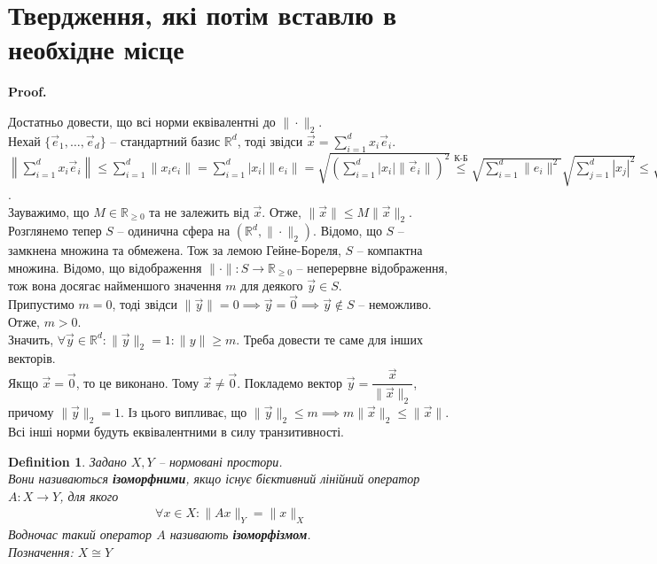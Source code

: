 \documentclass[a4paper, 10pt]{article}
\makeatletter
\theoremstyle{theoremdd}
\theoremstyle{theoremdd}
\newtheorem{definition}[theorem]{Definition}
\theoremstyle{theoremdd}
\theoremstyle{theoremdd}
\theoremstyle{theoremdd}
\theoremstyle{theoremdd}
\theoremstyle{theoremdd}
\theoremstyle{theoremdd}
\renewenvironment{proof}[1][Proof.\\]{\par
\pushQED{\hfill \qed}%
\normalfont \topsep6\p@\@plus6\p@\relax
\trivlist
\item\relax
{\bfseries
#1\@addpunct{.}}\hspace\labelsep\ignorespaces
}{%
\popQED\endtrivlist\@endpefalse
}
\makeatother
\begin{document}
\section*{Твердження, які потім вставлю в необхідне місце}
\begin{proof}
Достатньо довести, що всі норми еквівалентні до $\| \cdot \|_2$.\\
Нехай $\{\vec{e}_1,\dots,\vec{e}_d\}$ -- стандартний базис $\mathbb{R}^d$, тоді звідси $\vec{x} = \displaystyle\sum_{i=1}^d x_i \vec{e}_i$.\\
$\displaystyle\left\| \sum_{i=1}^d x_i \vec{e}_i
 \right\| \leq \sum_{i=1}^d \| x_i e_i \| = \sum_{i=1}^d |x_i| \|e_i\| = \sqrt{\left( \sum_{i=1}^d |x_i| \|\vec{e}_i\| \right)^2} \overset{\text{К-Б}}{\leq} \sqrt{\sum_{i=1}^d \|e_i\|^2} \sqrt{\sum_{j=1}^d |x_j|^2} \leq \sqrt{\sum_{i=1}^d \|e_i\|^2} \sqrt{\sum_{j=1}^\infty |x_j|^2} = \sqrt{\sum_{i=1}^d \|e_i\|^2} \|\vec{x}\|_2 = M \|\vec{x}\|_2$.\\
Зауважимо, що $M \in \mathbb{R}_{\geq 0}$ та не залежить від $\vec{x}$. Отже, $\|\vec{x}\| \leq M \|\vec{x}\|_2$.
\bigskip \\
Розглянемо тепер $S$ -- одинична сфера на $(\mathbb{R}^d, \|\cdot \|_2)$. Відомо, що $S$ -- замкнена множина та обмежена. Тож за лемою Гейне-Бореля, $S$ -- компактна множина. Відомо, що відображення $\| \cdot \| \colon S \to \mathbb{R}_{\geq 0}$ -- неперервне відображення, тож вона досягає найменшого значення $m$ для деякого $\vec{y} \in S$.\\
Припустимо $m = 0$, тоді звідси $\|\vec{y}\| = 0 \implies \vec{y} = \vec{0} \implies \vec{y} \notin S$ -- неможливо. Отже, $m > 0$.\\
Значить, $\forall \vec{y} \in \mathbb{R}^d: \|\vec{y}\|_2 = 1: \|y\| \geq m$. Треба довести те саме для інших векторів.\\
Якщо $\vec{x} = \vec{0}$, то це виконано. Тому $\vec{x} \neq \vec{0}$. Покладемо вектор $\vec{y} = \dfrac{\vec{x}}{\| \vec{x} \|_2}$, причому $\|\vec{y}\|_2 = 1$. Із цього випливає, що $\| \vec{y} \|_2 \leq m \implies m \|\vec{x}\|_2 \leq \|\vec{x}\|$.
\bigskip \\
Всі інші норми будуть еквівалентними в силу транзитивності.
\end{proof}

\begin{definition}
Задано $X,Y$ -- нормовані простори.\\
Вони називаються \textbf{ізоморфними}, якщо існує бієктивний лінійний оператор $A \colon X \to Y$, для якого
\begin{align*}
\forall x \in X: \|Ax\|_Y = \|x\|_X
\end{align*}
Водночас такий оператор $A$ називають \textbf{ізоморфізмом}.\\
Позначення: $X \cong Y$
\end{definition}
\end{document}
